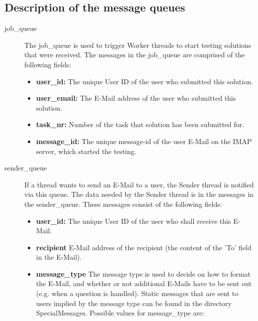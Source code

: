\subsection{Description of the message queues} \label{app:queues}

\begin{description}
\item [job\_queue] The job\_queue is used to trigger Worker threads to start testing
    solutions that were received. The messages in the job\_queue are comprised of
    the following fields:
    \begin{itemize}
        \item {\bf user\_id:} The unique User ID of the user who submitted this solution.
        \item {\bf user\_email:} The E-Mail address of the user who submitted this solution.
        \item {\bf task\_nr:} Number of the task that solution has been submitted for.
        \item {\bf message\_id:} The unique message-id of the user E-Mail on the IMAP server,
            which started the testing.
    \end{itemize}

\item [sender\_queue] If a thread wants to send an E-Mail to a user, the Sender thread
    is notified via this queue. The data needed by the Sender thread is in the messages
    in the sender\_queue. These messages consist of the following fields:
    \begin{itemize}
        \item {\bf user\_id:} The unique User ID of the user who shall receive this E-Mail.
        \item {\bf recipient} E-Mail address of the recipient (the content of the
            'To' field in the E-Mail).
        \item {\bf message\_type} The message type is used to decide on how to format
            the E-Mail, and whether or not additional E-Mails have to be sent out
            (e.g. when a question is handled). Static messages that are sent to users implied by
            the message type can be found in the directory SpecialMessages.
            Possible values for message\_type are:


\end{itemize}
\end{description}
